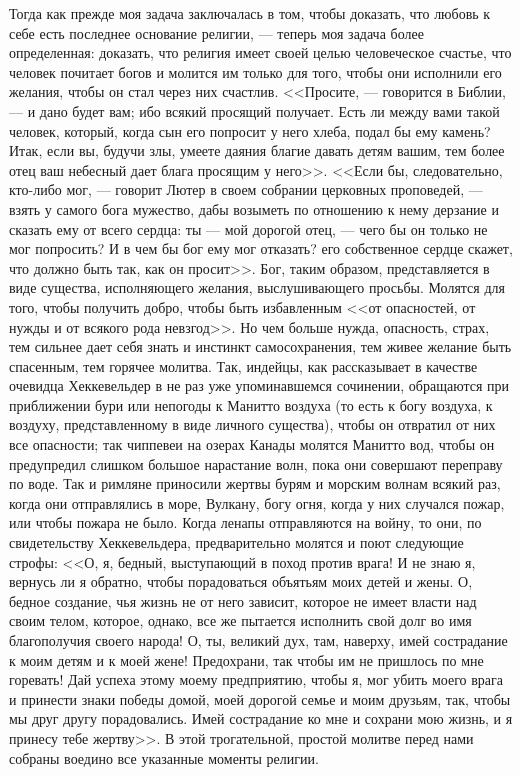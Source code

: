 \documentclass[12pt]{article}
\begin{document}
Тогда как прежде моя задача заключалась в том, чтобы доказать, что любовь к себе есть последнее основание религии, --- теперь моя задача более определенная: доказать, что религия имеет своей целью человеческое счастье, что человек почитает богов и молится им только для того, чтобы они исполнили его желания, чтобы он стал через них счастлив. <<Просите, --- говорится в Библии, --- и дано будет вам; ибо всякий просящий получает. Есть ли между вами такой человек, который, когда сын его попросит у него хлеба, подал бы ему камень? Итак, если вы, будучи злы, умеете даяния благие давать детям вашим, тем более отец ваш небесный дает блага просящим у него>>. <<Если бы, следовательно, кто-либо мог, --- говорит Лютер в своем собрании церковных проповедей, --- взять у самого бога мужество, дабы возыметь по отношению к нему дерзание и сказать ему от всего сердца: ты --- мой дорогой отец, --- чего бы он только не мог попросить? И в чем бы бог ему мог отказать? его собственное сердце скажет, что должно быть так, как он просит>>. Бог, таким образом, представляется в виде существа, исполняющего желания, выслушивающего просьбы. Молятся для того, чтобы получить добро, чтобы быть избавленным <<от опасностей, от нужды и от всякого рода невзгод>>. Но чем больше нужда, опасность, страх, тем сильнее дает себя знать и инстинкт самосохранения, тем живее желание быть спасенным, тем горячее молитва. Так, индейцы, как рассказывает в качестве очевидца Хеккевельдер в не раз уже упоминавшемся сочинении, обращаются при приближении бури или непогоды к Манитто воздуха (то есть к богу воздуха, к воздуху, представленному в виде личного существа), чтобы он отвратил от них все опасности; так чиппевеи на озерах Канады молятся Манитто вод, чтобы он предупредил слишком большое нарастание волн, пока они совершают переправу по воде. Так и римляне приносили жертвы бурям и морским волнам всякий раз, когда они отправлялись в море, Вулкану, богу огня, когда у них случался пожар, или чтобы пожара не было. Когда ленапы отправляются на войну, то они, по свидетельству Хеккевельдера, предварительно молятся и поют следующие строфы: <<О, я, бедный, выступающий в поход против врага! И не знаю я, вернусь ли я обратно, чтобы порадоваться объятьям моих детей и жены. О, бедное создание, чья жизнь не от него зависит, которое не имеет власти над своим телом, которое, однако, все же пытается исполнить свой долг во имя благополучия своего народа! О, ты, великий дух, там, наверху, имей сострадание к моим детям и к моей жене! Предохрани, так чтобы им не пришлось по мне горевать! Дай успеха этому моему предприятию, чтобы я, мог убить моего врага и принести знаки победы домой, моей дорогой семье и моим друзьям, так, чтобы мы друг другу порадовались. Имей сострадание ко мне и сохрани мою жизнь, и я принесу тебе жертву>>. В этой трогательной, простой молитве перед нами собраны воедино все указанные моменты религии. 
\end{document}
